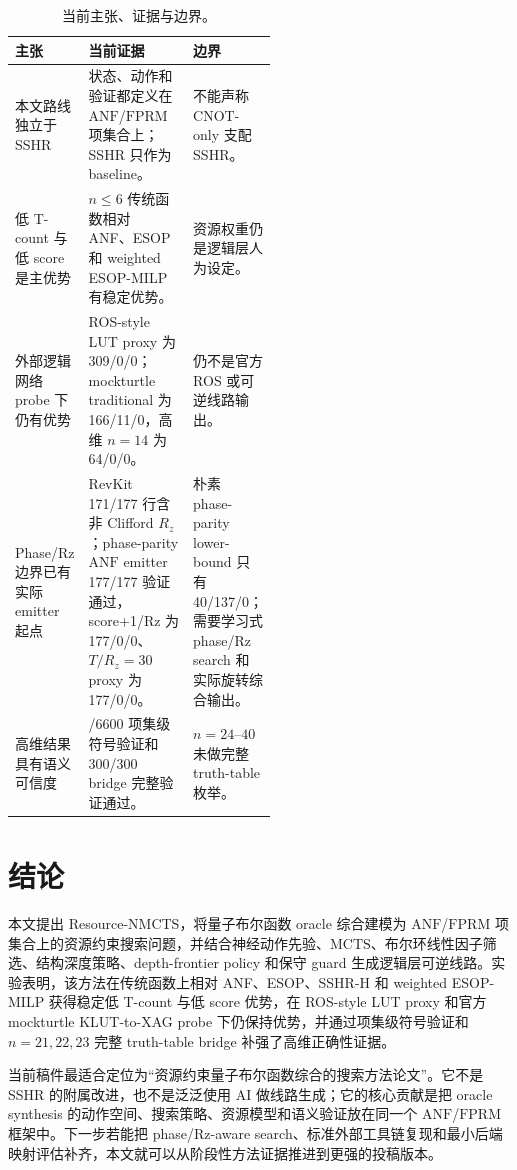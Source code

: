 \documentclass[UTF8,fontset=macnew,11pt]{ctexart}
\newcommand{\method}{Resource-NMCTS}
\newcommand{\anf}{\ensuremath{\mathrm{ANF}}}
\newcommand{\fprm}{\ensuremath{\mathrm{FPRM}}}
\newcommand{\mcts}{\ensuremath{\mathrm{MCTS}}}
\newcommand{\rz}{\ensuremath{R_z}}
\newcommand{\ttable}{truth-table}
\begin{document}
\begin{table}[H]
\centering
\small
\caption{当前主张、证据与边界。}
\label{tab:evidence-map}
\begin{tabularx}{\linewidth}{>{\raggedright\arraybackslash}p{0.27\linewidth}>{\raggedright\arraybackslash}X>{\raggedright\arraybackslash}p{0.25\linewidth}}
\toprule
主张 & 当前证据 & 边界 \\
\midrule
本文路线独立于 SSHR & 状态、动作和验证都定义在 \anf{}/\fprm{} 项集合上；SSHR 只作为 baseline。 & 不能声称 CNOT-only 支配 SSHR。 \\
低 T-count 与低 score 是主优势 & $n\leq6$ 传统函数相对 ANF、ESOP 和 weighted ESOP-MILP 有稳定优势。 & 资源权重仍是逻辑层人为设定。 \\
外部逻辑网络 probe 下仍有优势 & ROS-style LUT proxy 为 309/0/0；mockturtle traditional 为 166/11/0，高维 $n=14$ 为 64/0/0。 & 仍不是官方 ROS 或可逆线路输出。 \\
Phase/Rz 边界已有实际 emitter 起点 & RevKit 171/177 行含非 Clifford \rz{}；phase-parity \anf{} emitter 177/177 验证通过，score+1/Rz 为 177/0/0、$T/R_z=30$ proxy 为 177/0/0。 & 朴素 phase-parity lower-bound 只有 40/137/0；需要学习式 phase/Rz search 和实际旋转综合输出。 \\
高维结果具有语义可信度 & 6600/6600 项集级符号验证和 300/300 bridge 完整验证通过。 & $n=24$--$40$ 未做完整 \ttable{} 枚举。 \\
\bottomrule
\end{tabularx}
\end{table}

\section{结论}

本文提出 \method{}，将量子布尔函数 oracle 综合建模为 \anf{}/\fprm{} 项集合上的资源约束搜索问题，并结合神经动作先验、\mcts{}、布尔环线性因子筛选、结构深度策略、depth-frontier policy 和保守 guard 生成逻辑层可逆线路。实验表明，该方法在传统函数上相对 ANF、ESOP、SSHR-H 和 weighted ESOP-MILP 获得稳定低 T-count 与低 score 优势，在 ROS-style LUT proxy 和官方 mockturtle KLUT-to-XAG probe 下仍保持优势，并通过项集级符号验证和 $n=21,22,23$ 完整 truth-table bridge 补强了高维正确性证据。

当前稿件最适合定位为“资源约束量子布尔函数综合的搜索方法论文”。它不是 SSHR 的附属改进，也不是泛泛使用 AI 做线路生成；它的核心贡献是把 oracle synthesis 的动作空间、搜索策略、资源模型和语义验证放在同一个 \anf{}/\fprm{} 框架中。下一步若能把 phase/Rz-aware search、标准外部工具链复现和最小后端映射评估补齐，本文就可以从阶段性方法证据推进到更强的投稿版本。
\end{document}
